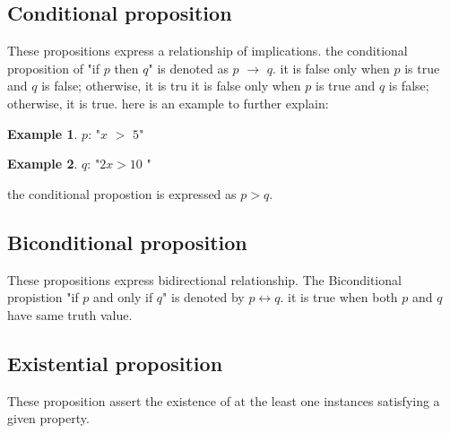 \documentclass{article}
\theoremstyle{definition}
\newtheorem{example}{Example}
\begin{document}
\subsection{Conditional proposition}
These propositions express a relationship of implications. the conditional proposition of "if $p$ then $q$" is denoted as $p$ $\to$ $q$. it is false only when $p$ is true and $q$ is false; otherwise, it is tru it is false only when $p$ is true and $q$ is false; otherwise, it is true. 
here is an example to further explain: 

\begin{example}
  $p$: "$x$ $>$ $5$"
\end{example}

\begin{example}
  $q$: "$2x > 10$ "
\end{example}

the conditional propostion is expressed as $p > q$.

\subsection{Biconditional proposition}
These propositions express bidirectional relationship. The Biconditional propistion "if $p$ and only if $q$" is denoted by $p \leftrightarrow q$. it is true when both $p$ and $q$ have same truth value.

\subsection{Existential proposition}
These proposition assert the existence of at the least one instances satisfying a given property. 
\end{document}
